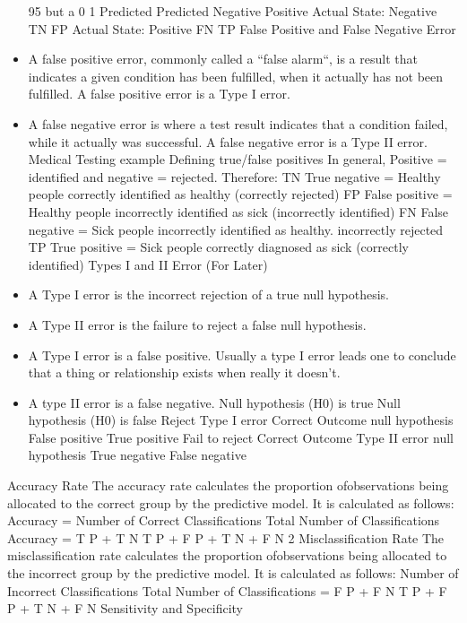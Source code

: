 \documentclass[a4paper,12pt]{article}
\begin{document}
\begin{itemize}
95%
but a 0%
1
Predicted Predicted
Negative Positive
Actual State: Negative TN FP
Actual State: Positive FN TP
False Positive and False Negative Error
\item  A false positive error, commonly called a “false alarm“, is a result that indicates a given
condition has been fulfilled, when it actually has not been fulfilled. A false positive error is
a Type I error.
\item  A false negative error is where a test result indicates that a condition failed, while it actually
was successful. A false negative error is a Type II error.
Medical Testing example Defining true/false positives
In general, Positive = identified and negative = rejected. Therefore:
TN True negative = Healthy people correctly identified as healthy (correctly rejected)
FP False positive = Healthy people incorrectly identified as sick (incorrectly identified)
FN False negative = Sick people incorrectly identified as healthy. incorrectly rejected
TP True positive = Sick people correctly diagnosed as sick (correctly identified)
Types I and II Error (For Later)
\item  A Type I error is the incorrect rejection of a true null hypothesis.
\item  A Type II error is the failure to reject a false null hypothesis.
\item  A Type I error is a false positive. Usually a type I error leads one to conclude that a thing
or relationship exists when really it doesn’t.
\item  A type II error is a false negative.
Null hypothesis (H0) is true Null hypothesis (H0) is false
Reject Type I error Correct Outcome
null hypothesis False positive True positive
Fail to reject Correct Outcome Type II error
null hypothesis True negative False negative
\end{itemize}
Accuracy Rate
The accuracy rate calculates the proportion ofobservations being allocated to the correct group
by the predictive model. It is calculated as follows:
Accuracy = Number of Correct Classifications
Total Number of Classifications
Accuracy = T P + T N
T P + F P + T N + F N
2
Misclassification Rate
The misclassification rate calculates the proportion ofobservations being allocated to the incorrect
group by the predictive model. It is calculated as follows:
Number of Incorrect Classifications
Total Number of Classifications
=
F P + F N
T P + F P + T N + F N
Sensitivity and Specificity
\end{document}
